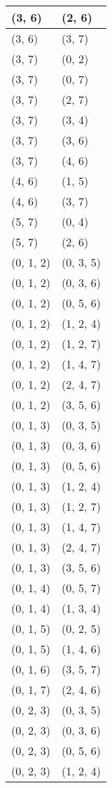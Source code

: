 \begin{footnotesize}
\begin{longtable}[c]{|l|l|}
(3, 6)
&(2, 6)
\\ \hline
(3, 6)
&(3, 7)
\\ \hline
(3, 7)
&(0, 2)
\\ \hline
(3, 7)
&(0, 7)
\\ \hline
(3, 7)
&(2, 7)
\\ \hline
(3, 7)
&(3, 4)
\\ \hline
(3, 7)
&(3, 6)
\\ \hline
(3, 7)
&(4, 6)
\\ \hline
(4, 6)
&(1, 5)
\\ \hline
(4, 6)
&(3, 7)
\\ \hline
(5, 7)
&(0, 4)
\\ \hline
(5, 7)
&(2, 6)
\\ \hline
(0, 1, 2)
&(0, 3, 5)
\\ \hline
(0, 1, 2)
&(0, 3, 6)
\\ \hline
(0, 1, 2)
&(0, 5, 6)
\\ \hline
(0, 1, 2)
&(1, 2, 4)
\\ \hline
(0, 1, 2)
&(1, 2, 7)
\\ \hline
(0, 1, 2)
&(1, 4, 7)
\\ \hline
(0, 1, 2)
&(2, 4, 7)
\\ \hline
(0, 1, 2)
&(3, 5, 6)
\\ \hline
(0, 1, 3)
&(0, 3, 5)
\\ \hline
(0, 1, 3)
&(0, 3, 6)
\\ \hline
(0, 1, 3)
&(0, 5, 6)
\\ \hline
(0, 1, 3)
&(1, 2, 4)
\\ \hline
(0, 1, 3)
&(1, 2, 7)
\\ \hline
(0, 1, 3)
&(1, 4, 7)
\\ \hline
(0, 1, 3)
&(2, 4, 7)
\\ \hline
(0, 1, 3)
&(3, 5, 6)
\\ \hline
(0, 1, 4)
&(0, 5, 7)
\\ \hline
(0, 1, 4)
&(1, 3, 4)
\\ \hline
(0, 1, 5)
&(0, 2, 5)
\\ \hline
(0, 1, 5)
&(1, 4, 6)
\\ \hline
(0, 1, 6)
&(3, 5, 7)
\\ \hline
(0, 1, 7)
&(2, 4, 6)
\\ \hline
(0, 2, 3)
&(0, 3, 5)
\\ \hline
(0, 2, 3)
&(0, 3, 6)
\\ \hline
(0, 2, 3)
&(0, 5, 6)
\\ \hline
(0, 2, 3)
&(1, 2, 4)
\\ \hline

\end{longtable}
\end{footnotesize}
